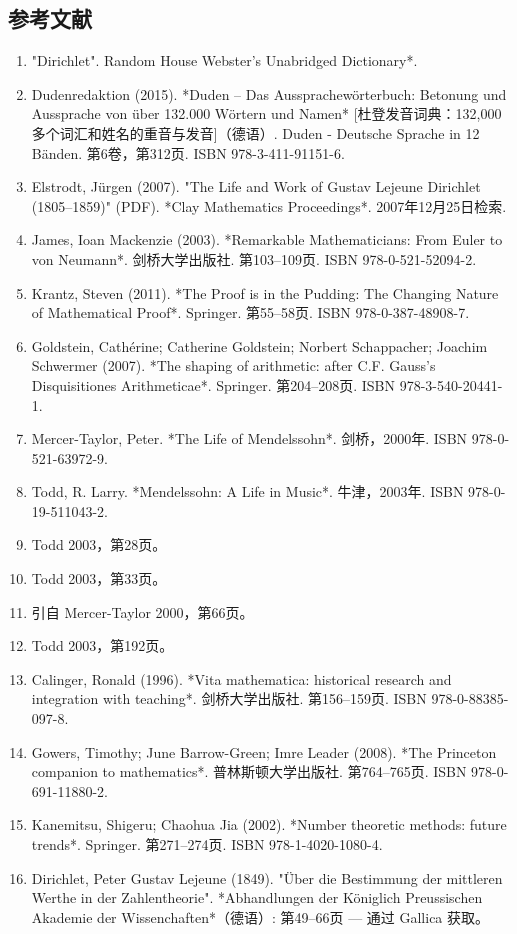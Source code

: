 \subsection{参考文献}
\begin{enumerate}
\item "Dirichlet". Random House Webster's Unabridged Dictionary*.
\item Dudenredaktion (2015). *Duden – Das Aussprachewörterbuch: Betonung und Aussprache von über 132.000 Wörtern und Namen* [杜登发音词典：132,000多个词汇和姓名的重音与发音]（德语）. Duden - Deutsche Sprache in 12 Bänden. 第6卷，第312页. ISBN 978-3-411-91151-6.
\item Elstrodt, Jürgen (2007). "The Life and Work of Gustav Lejeune Dirichlet (1805–1859)" (PDF). *Clay Mathematics Proceedings*. 2007年12月25日检索.
\item James, Ioan Mackenzie (2003). *Remarkable Mathematicians: From Euler to von Neumann*. 剑桥大学出版社. 第103–109页. ISBN 978-0-521-52094-2.
\item Krantz, Steven (2011). *The Proof is in the Pudding: The Changing Nature of Mathematical Proof*. Springer. 第55–58页. ISBN 978-0-387-48908-7.
\item Goldstein, Cathérine; Catherine Goldstein; Norbert Schappacher; Joachim Schwermer (2007). *The shaping of arithmetic: after C.F. Gauss's Disquisitiones Arithmeticae*. Springer. 第204–208页. ISBN 978-3-540-20441-1.
\item Mercer-Taylor, Peter. *The Life of Mendelssohn*. 剑桥，2000年. ISBN 978-0-521-63972-9.
\item Todd, R. Larry. *Mendelssohn: A Life in Music*. 牛津，2003年. ISBN 978-0-19-511043-2.
\item Todd 2003，第28页。
\item Todd 2003，第33页。
\item 引自 Mercer-Taylor 2000，第66页。
\item Todd 2003，第192页。
\item Calinger, Ronald (1996). *Vita mathematica: historical research and integration with teaching*. 剑桥大学出版社. 第156–159页. ISBN 978-0-88385-097-8.
\item Gowers, Timothy; June Barrow-Green; Imre Leader (2008). *The Princeton companion to mathematics*. 普林斯顿大学出版社. 第764–765页. ISBN 978-0-691-11880-2.
\item Kanemitsu, Shigeru; Chaohua Jia (2002). *Number theoretic methods: future trends*. Springer. 第271–274页. ISBN 978-1-4020-1080-4.
\item Dirichlet, Peter Gustav Lejeune (1849). "Über die Bestimmung der mittleren Werthe in der Zahlentheorie". *Abhandlungen der Königlich Preussischen Akademie der Wissenchaften*（德语）: 第49–66页 — 通过 Gallica 获取。

\end{enumerate}

